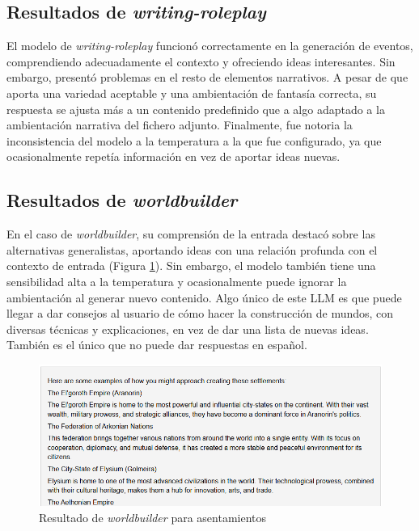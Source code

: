\subsection{Resultados de \textit{writing-roleplay}}
El modelo de \textit{writing-roleplay} funcionó correctamente en la generación de eventos,
comprendiendo adecuadamente el contexto y ofreciendo ideas interesantes.
Sin embargo, presentó problemas en el resto de elementos narrativos.
A pesar de que aporta una variedad aceptable y una ambientación de fantasía correcta,
su respuesta se ajusta más a un contenido predefinido que a algo adaptado a la ambientación
narrativa del fichero adjunto.
Finalmente, fue notoria la inconsistencia del modelo a la temperatura a la que fue configurado,
ya que ocasionalmente repetía información en vez de aportar ideas nuevas.

\subsection{Resultados de \textit{worldbuilder}}
En el caso de \textit{worldbuilder},
su comprensión de la entrada destacó sobre las alternativas generalistas,
aportando ideas con una relación profunda con el contexto de entrada
(Figura \ref{fig:worldbuilder-settle}).
Sin embargo, el modelo también tiene una sensibilidad alta a la temperatura
y ocasionalmente puede ignorar la ambientación al generar nuevo contenido.
Algo único de este LLM es que puede llegar a dar consejos al usuario de cómo
hacer la construcción de mundos, con diversas técnicas y explicaciones,
en vez de dar una lista de nuevas ideas.
También es el único que no puede dar respuestas en español.

\begin{figure}[htbp]
	\centering
	\includegraphics[width=1\textwidth]{./Figures/worldbuilder-noprompt-settlements.png}
	\caption{Resultado de \textit{worldbuilder} para asentamientos}
	\label{fig:worldbuilder-settle}
\end{figure}

